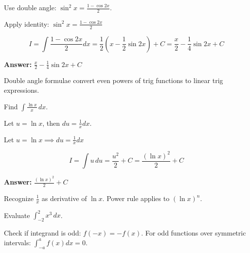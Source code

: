 \begin{hint}
Use double angle: $\sin^2 x = \frac{1-\cos 2x}{2}$.
\end{hint}

\begin{solution}
Apply identity: $\sin^2 x = \frac{1-\cos 2x}{2}$

\[
I = \int \frac{1-\cos 2x}{2} dx = \frac{1}{2}\left(x - \frac{1}{2}\sin 2x\right) + C = \frac{x}{2} - \frac{1}{4}\sin 2x + C
\]

\textbf{Answer:} $\boxed{\frac{x}{2} - \frac{1}{4}\sin 2x + C}$
\end{solution}

\begin{takeaways}
Double angle formulae convert even powers of trig functions to linear trig expressions.
\end{takeaways}

\vspace{1cm}

\begin{problem}
Find $\displaystyle \int \frac{\ln x}{x} \, dx$.
\end{problem}

\begin{hint}
Let $u = \ln x$, then $du = \frac{1}{x}dx$.
\end{hint}

\begin{solution}
Let $u = \ln x \implies du = \frac{1}{x}dx$

\[
I = \int u \, du = \frac{u^2}{2} + C = \frac{(\ln x)^2}{2} + C
\]

\textbf{Answer:} $\boxed{\frac{(\ln x)^2}{2} + C}$
\end{solution}

\begin{takeaways}
Recognize $\frac{1}{x}$ as derivative of $\ln x$. Power rule applies to $(\ln x)^n$.
\end{takeaways}

\vspace{1cm}

\begin{problem}
Evaluate $\displaystyle \int_{-2}^{2} x^3 \, dx$.
\end{problem}

\begin{hint}
Check if integrand is odd: $f(-x) = -f(x)$. For odd functions over symmetric intervals: $\int_{-a}^a f(x)dx = 0$.
\end{hint}


